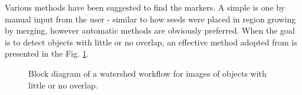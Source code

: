 \documentclass[a4paper]{article}
\begin{document}
 Various methods have been suggested to find the markers. A simple is one by manual input from the user - similar to how seeds were placed in region growing by merging, however automatic methods are obviously preferred. When the goal is to detect objects with little or no overlap, an effective method adopted from \TODO[ref] is presented in the Fig. \ref{fig:wshed_dt_block_diagram}.

    \begin{figure}[H]
    \centering
    
    \caption{Block diagram of a watershed workflow for images of objects with little or no overlap.} \label{fig:wshed_dt_block_diagram}
    \end{figure}
\end{document}
